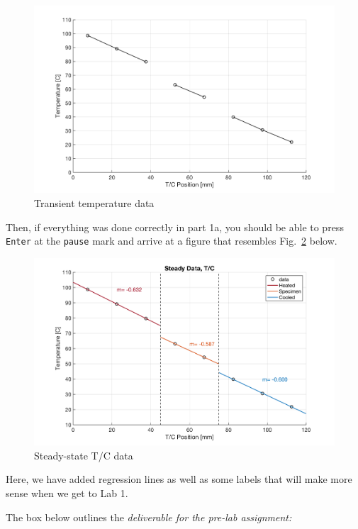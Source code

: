 \documentclass[11pt, letterpaper]{article}
\begin{document}
\begin{figure}[H]
    \begin{center}
        \includegraphics[width=125mm]{gfx/fig2.png}
    \caption{Transient temperature data}\label{fig2}
    \end{center}
\end{figure}

Then, if everything was done correctly in part 1a, you should be able to press \texttt{Enter} at the \texttt{pause} mark and arrive at a figure that resembles Fig.~\ref{fig3} below.

\begin{figure}[H]
    \begin{center}
        \includegraphics[width=125mm]{gfx/fig3.png}
    \caption{Steady-state T/C data}\label{fig3}
    \end{center}
\end{figure}

Here, we have added regression lines as well as some labels that will make more sense when we get to Lab 1.

\n
The box below outlines the \it{deliverable} for the pre-lab assignment:
\end{document}

